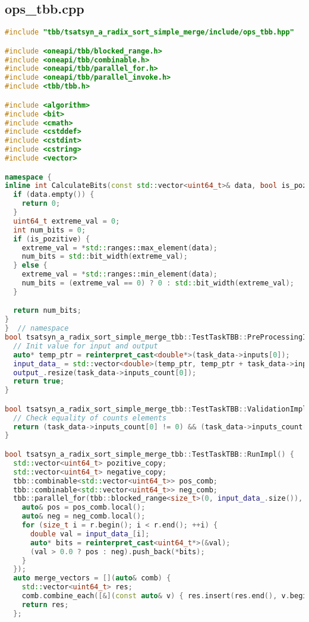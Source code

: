 \documentclass[a4paper,12pt]{article}
\begin{document}
\subsection{ops\_tbb.cpp}
\begin{lstlisting}[language=C++,
    breaklines=true,       % Автоматический перенос строк
    basicstyle=\small\ttfamily, % Уменьшенный шрифт
    columns=fullflexible ]
    #include "tbb/tsatsyn_a_radix_sort_simple_merge/include/ops_tbb.hpp"

#include <oneapi/tbb/blocked_range.h>
#include <oneapi/tbb/combinable.h>
#include <oneapi/tbb/parallel_for.h>
#include <oneapi/tbb/parallel_invoke.h>
#include <tbb/tbb.h>

#include <algorithm>
#include <bit>
#include <cmath>
#include <cstddef>
#include <cstdint>
#include <cstring>
#include <vector>

namespace {
inline int CalculateBits(const std::vector<uint64_t>& data, bool is_pozitive) {
  if (data.empty()) {
    return 0;
  }
  uint64_t extreme_val = 0;
  int num_bits = 0;
  if (is_pozitive) {
    extreme_val = *std::ranges::max_element(data);
    num_bits = std::bit_width(extreme_val);
  } else {
    extreme_val = *std::ranges::min_element(data);
    num_bits = (extreme_val == 0) ? 0 : std::bit_width(extreme_val);
  }

  return num_bits;
}
}  // namespace
bool tsatsyn_a_radix_sort_simple_merge_tbb::TestTaskTBB::PreProcessingImpl() {
  // Init value for input and output
  auto* temp_ptr = reinterpret_cast<double*>(task_data->inputs[0]);
  input_data_ = std::vector<double>(temp_ptr, temp_ptr + task_data->inputs_count[0]);
  output_.resize(task_data->inputs_count[0]);
  return true;
}

bool tsatsyn_a_radix_sort_simple_merge_tbb::TestTaskTBB::ValidationImpl() {
  // Check equality of counts elements
  return (task_data->inputs_count[0] != 0) && (task_data->inputs_count[0] == task_data->outputs_count[0]);
}

bool tsatsyn_a_radix_sort_simple_merge_tbb::TestTaskTBB::RunImpl() {
  std::vector<uint64_t> pozitive_copy;
  std::vector<uint64_t> negative_copy;
  tbb::combinable<std::vector<uint64_t>> pos_comb;
  tbb::combinable<std::vector<uint64_t>> neg_comb;
  tbb::parallel_for(tbb::blocked_range<size_t>(0, input_data_.size()), [&](const auto& r) {
    auto& pos = pos_comb.local();
    auto& neg = neg_comb.local();
    for (size_t i = r.begin(); i < r.end(); ++i) {
      double val = input_data_[i];
      auto* bits = reinterpret_cast<uint64_t*>(&val);
      (val > 0.0 ? pos : neg).push_back(*bits);
    }
  });
  auto merge_vectors = [](auto& comb) {
    std::vector<uint64_t> res;
    comb.combine_each([&](const auto& v) { res.insert(res.end(), v.begin(), v.end()); });
    return res;
  };


\end{lstlisting}
\end{document}
